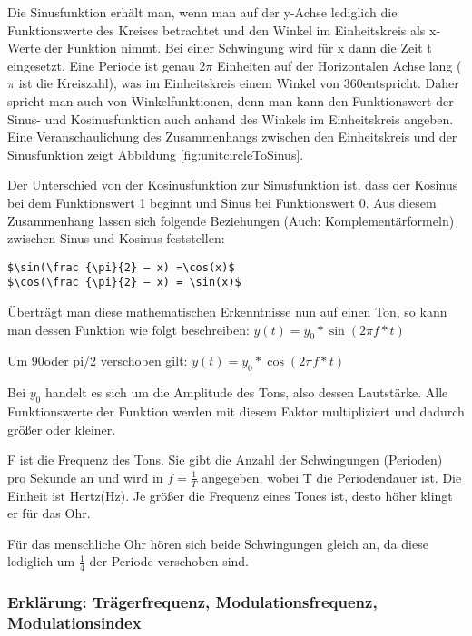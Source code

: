 Die Sinusfunktion erhält man, wenn man auf der y-Achse lediglich die Funktionswerte des Kreises betrachtet und den Winkel im Einheitskreis als x-Werte der Funktion nimmt. Bei einer Schwingung wird für x dann die Zeit t eingesetzt. Eine Periode ist genau $2\pi$ Einheiten auf der Horizontalen Achse lang ($\pi$ ist die Kreiszahl), was im Einheitskreis einem Winkel von 360\degree  entspricht. Daher spricht man auch von Winkelfunktionen, denn man kann den Funktionswert der Sinus- und Kosinusfunktion auch anhand des Winkels im Einheitskreis angeben. 
Eine Veranschaulichung des Zusammenhangs zwischen den Einheitskreis und der Sinusfunktion zeigt Abbildung \ref{fig:unitcircleToSinus}.

Der Unterschied von der Kosinusfunktion zur Sinusfunktion ist, dass der Kosinus bei dem Funktionswert 1 beginnt und Sinus bei Funktionswert 0. Aus diesem Zusammenhang lassen sich folgende Beziehungen (Auch: Komplementärformeln) zwischen Sinus und Kosinus feststellen:\\

\begin{lstlisting}[mathescape]
$\sin(\frac {\pi}{2} – x) =\cos(x)$
$\cos(\frac {\pi}{2} – x) = \sin(x)$ 
\end{lstlisting}\cite[s. 218]{matheBuch}

Überträgt man diese mathematischen Erkenntnisse nun auf einen Ton, so kann man dessen Funktion wie folgt beschreiben: 		$y(t) = y_0 * \sin(2 \pi f * t)$

Um 90\degree oder pi/2 verschoben gilt: 		$y(t) = y_0*\cos(2 \pi f*t)$

Bei $y_0$ handelt es sich um die Amplitude des Tons, also dessen Lautstärke. Alle Funktionswerte der Funktion werden mit diesem Faktor multipliziert und dadurch größer oder kleiner.

F ist die Frequenz des Tons. Sie gibt die Anzahl der Schwingungen (Perioden) pro Sekunde an und wird in $f=\frac{1}{T}$ angegeben, wobei T die Periodendauer ist. Die Einheit ist Hertz(Hz).
Je größer die Frequenz eines Tones ist, desto höher klingt er für das Ohr.

Für das menschliche Ohr hören sich beide Schwingungen gleich an, da diese lediglich um $\frac{1}{4}$ der Periode verschoben sind. 

\subsubsection{Erklärung: Trägerfrequenz, Modulationsfrequenz, Modulationsindex}

